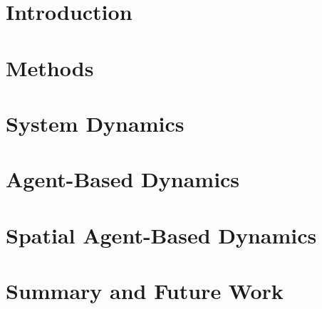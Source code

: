 \documentclass[10pt]{article}
\begin{document}

\section{Introduction}



\section{Methods}



\section{System Dynamics}


\section{Agent-Based Dynamics}



\section{Spatial Agent-Based Dynamics}




\section{Summary and Future Work}

\end{document}
